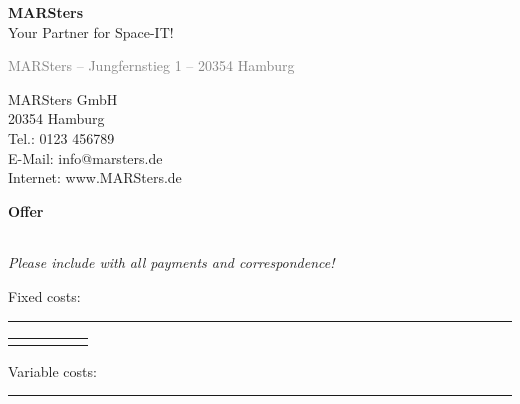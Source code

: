 \documentclass[12pt,a4paper]{article}
\begin{document}
\noindent
\raggedleft
\Huge\textbf{MARSters} \\[0.3em]
\large Your Partner for Space-IT! \\
\vspace{2em}
\begin{minipage}[t]{0.5\textwidth}
{\small \textcolor{gray}{MARSters – Jungfernstieg 1 – 20354 Hamburg}} \\[1em]

\end{minipage}
\hfill
\begin{minipage}[t]{0.45\textwidth}
\raggedleft
\vspace{1em}
MARSters GmbH \\
20354 Hamburg \\
Tel.: 0123 456789 \\
E-Mail: info@marsters.de \\
Internet: www.MARSters.de
\end{minipage}

\vspace{1.8em}

\textbf{\LARGE Offer}

\vspace{1em}
\begin{tabularx}{\textwidth}{@{}l X r@{}}

\end{tabularx}

\small\textit{Please include with all payments and correspondence!}

\vspace{1em}
\begin{flushleft}
Fixed costs: \\
\rule{\textwidth}{0.5pt}
\end{flushleft}

\renewcommand{\arraystretch}{1.4}
\begin{tabularx}{\textwidth}{|l|X|r|l|r|}
\hline
\rowcolor{gray!30}


\end{tabularx}
\vspace{8.5em}

\vspace{1em}
\begin{flushleft}
Variable costs: \\
\rule{\textwidth}{0.5pt}
\end{flushleft}
\end{document}
